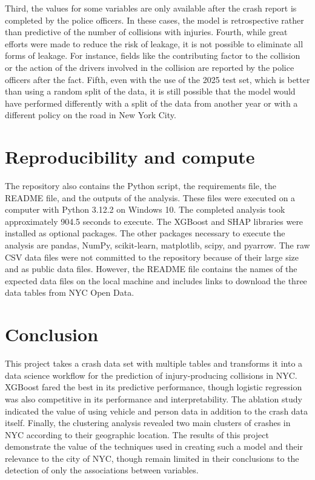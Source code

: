 \documentclass{article}
\begin{document}
Third, the values for some variables are only available after the crash report is completed by the police officers. In these cases, the model is retrospective rather than predictive of the number of collisions with injuries. Fourth, while great efforts were made to reduce the risk of leakage, it is not possible to eliminate all forms of leakage. For instance, fields like the contributing factor to the collision or the action of the drivers involved in the collision are reported by the police officers after the fact. Fifth, even with the use of the 2025 test set, which is better than using a random split of the data, it is still possible that the model would have performed differently with a split of the data from another year or with a different policy on the road in New York City.

\section{Reproducibility and compute}
The repository also contains the Python script, the requirements file, the README file, and the outputs of the analysis. These files were executed on a computer with Python 3.12.2 on Windows 10. The completed analysis took approximately 904.5 seconds to execute. The XGBoost and SHAP libraries were installed as optional packages. The other packages necessary to execute the analysis are pandas, NumPy, scikit-learn, matplotlib, scipy, and pyarrow. The raw CSV data files were not committed to the repository because of their large size and as public data files. However, the README file contains the names of the expected data files on the local machine and includes links to download the three data tables from NYC Open Data.

\section{Conclusion}
This project takes a crash data set with multiple tables and transforms it into a data science workflow for the prediction of injury-producing collisions in NYC. XGBoost fared the best in its predictive performance, though logistic regression was also competitive in its performance and interpretability. The ablation study indicated the value of using vehicle and person data in addition to the crash data itself. Finally, the clustering analysis revealed two main clusters of crashes in NYC according to their geographic location. The results of this project demonstrate the value of the techniques used in creating such a model and their relevance to the city of NYC, though remain limited in their conclusions to the detection of only the associations between variables.
\end{document}
